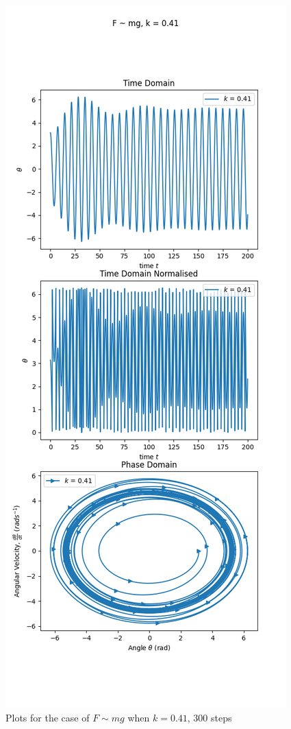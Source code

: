 \documentclass[10pt, twocolumn]{article}
\begin{document}
\twocolumn
\begin{figure}[H]
    \centering
    \includegraphics[width = \columnwidth]{Projects/ForcedSimplePendulum/Plots/Plot of F~mg, k is 0.41 (med).png}
    \caption{Plots for the case of $F\sim{mg}$ when $k = 0.41$, 300 steps}
    \label{k = 0.41 med}
\end{figure}
\end{document}
